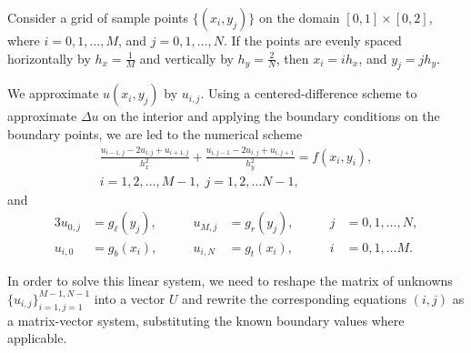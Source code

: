 \documentclass{homework}
\begin{document}
	\begin{alphaparts}
		\questionpart Consider a grid of sample points $\{(x_i, y_j)\}$ on the domain $[0,1]\times[0,2]$, where $i = 0,1,\dots, M$, and $j = 0,1,\dots, N$. If the points are evenly spaced horizontally by $h_x = \frac{1}{M}$ and vertically by $h_y = \frac{2}{N}$, then $x_i = ih_x$, and $y_j = jh_y$.
		
		We approximate $u(x_i,y_j)$ by $u_{i,j}$. Using a centered-difference scheme to approximate $\Delta u$ on the interior and applying the boundary conditions on the boundary points, we are led to the numerical scheme
		\begin{equation*}
			\tag{$i,j$}
			\begin{split}
				\frac{u_{i-1,j} - 2u_{i,j} + u_{i+1,j}}{h_x^2} + \frac{u_{i,j-1} -2 u_{i,j} + u_{i,j+1}}{h_y^2} = f(x_i, y_i),\\  i=1,2,\dots, M-1,\; j=1,2,\dots N-1,
			\end{split}
		\end{equation*}
		and
		\begin{alignat*}{3}
			u_{0,j} &= g_\ell(y_j),& \qquad u_{M,j} &= g_r(y_j),& \qquad j&=0,1,\dots,N,\\
			u_{i,0} &= g_b(x_i), & \qquad u_{i,N} &= g_t(x_i),& \qquad i&=0,1,\dots M.
		\end{alignat*}
		
		
		
		In order to solve this linear system, we need to reshape the matrix of unknowns $\{u_{i,j}\}_{i=1,j=1}^{M-1,N-1}$ into a vector $U$ and rewrite the corresponding equations $(i,j)$ as a matrix-vector system, substituting the known boundary values where applicable.
		

\end{alphaparts}
\end{document}
